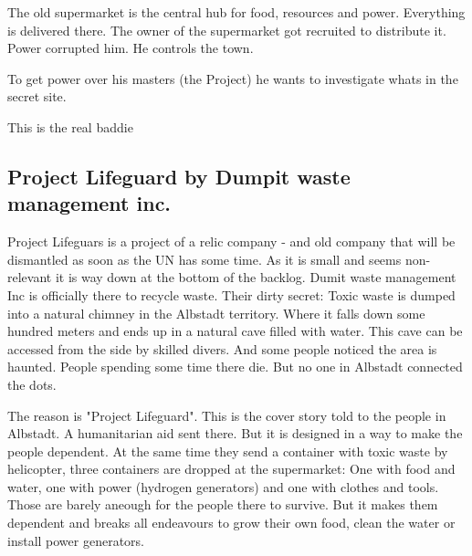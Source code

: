 \begin{npcBox}[title=Ash]
    \begin{consequences}
    \item {}
    \item {}
    \item {}
    \end{consequences}
    
    \begin{npcDescription}
    The old supermarket is the central hub for food, resources and power. Everything is delivered there. The owner of the supermarket got recruited to distribute it. Power corrupted him. He controls the town.

    To get power over his masters (the Project) he wants to investigate whats in the secret site.
    
    This is the real baddie
    \end{npcDescription}
    
\end{npcBox}




\subsection{Project Lifeguard by Dumpit waste management inc.}

Project Lifeguars is a project of a relic company - and old company that will be dismantled as soon as the UN has some time. As it is small and seems non-relevant it is way down at the bottom of the backlog.
Dumit waste management Inc is officially there to recycle waste. Their dirty secret: Toxic waste is dumped into a natural chimney in the Albstadt territory. Where it falls down some hundred meters and ends up in a natural cave filled with water. This cave can be accessed from the side by skilled divers. And some people noticed the area is haunted. People spending some time there die. But no one in Albstadt connected the dots.

The reason is "Project Lifeguard". This is the cover story told to the people in Albstadt. A humanitarian aid sent there. But it is designed in a way to make the people dependent. At the same time they send a container with toxic waste by helicopter, three containers are dropped at the supermarket: One with food and water, one with power (hydrogen generators) and one with clothes and tools.
Those are barely aneough for the people there to survive. But it makes them dependent and breaks all endeavours to grow their own food, clean the water or install power generators.

